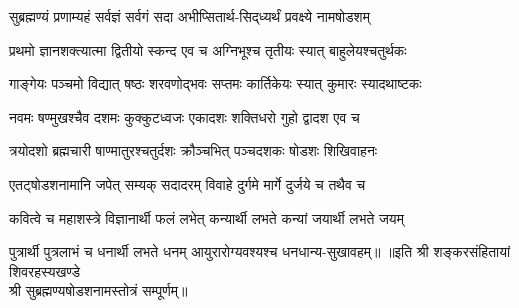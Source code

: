 
\twolineshloka
{सुब्रह्मण्यं प्रणाम्यहं सर्वज्ञं सर्वगं सदा}
{अभीप्सितार्थ-सिद्‌ध्यर्थं प्रवक्ष्ये नामषोडशम्}

\twolineshloka
{प्रथमो ज्ञानशक्त्यात्मा द्वितीयो स्कन्द एव च}
{अग्निभूश्च तृतीयः स्यात् बाहुलेयश्चतुर्थकः}

\twolineshloka
{गाङ्गेयः पञ्चमो विद्यात् षष्ठः शरवणोद्भवः}
{सप्तमः कार्तिकेयः स्यात् कुमारः स्यादथाष्टकः}

\twolineshloka
{नवमः षण्मुखश्चैव दशमः कुक्कुटध्वजः}
{एकादशः शक्तिधरो गुहो द्वादश एव च}

\twolineshloka
{त्रयोदशो ब्रह्मचारी षाण्मातुरश्चतुर्दशः}
{क्रौञ्चभित् पञ्चदशकः षोडशः शिखिवाहनः}

\twolineshloka
{एतट्षोडशनामानि जपेत् सम्यक् सदादरम्}
{विवाहे दुर्गमे मार्गे दुर्जये च तथैव च}

\twolineshloka
{कवित्वे च महाशस्त्रे विज्ञानार्थी फलं लभेत्}
{कन्यार्थी लभते कन्यां जयार्थी लभते जयम्}

\twolineshloka
{पुत्रार्थी पुत्रलाभं  च धनार्थी लभते धनम्}
{आयुरारोग्यवश्यश्च धनधान्य-सुखावहम्॥}
॥इति श्री शङ्करसंहितायां शिवरहस्यखण्डे\\
श्री सुब्रह्मण्यषोडशनामस्तोत्रं सम्पूर्णम्॥